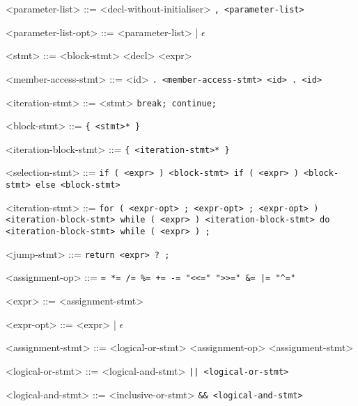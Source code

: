 \documentclass[a4paper, 12pt]{extarticle}
\begin{document}
\begin{grammar}
            <parameter-list> ::= <decl-without-initialiser> \tt{,} <parameter-list>

            <parameter-list-opt> ::= <parameter-list> | $\epsilon$

            <stmt> ::= <block-stmt>
            \alt <decl>
            \alt <expr>
            
            <member-access-stmt> ::= <id> \tt{.} <member-access-stmt>
            \alt <id> \tt{.} <id>

            <iteration-stmt> ::= <stmt>
            \alt \tt{break};
            \alt \tt{continue};
            
            <block-stmt> ::= \tt{\{} <stmt>* \tt{\}}
            
            <iteration-block-stmt> ::= \tt{\{} <iteration-stmt>* \tt{\}}

            <selection-stmt> ::= \tt{if} \tt{(} <expr> \tt{)} <block-stmt>
            \alt \tt{if} \tt{(} <expr> \tt{)} <block-stmt> \tt{else} <block-stmt>

            <iteration-stmt> ::= \tt{for} \tt{(} <expr-opt> \tt{;} <expr-opt> \tt{;} <expr-opt> \tt{)} <iteration-block-stmt>
            \alt \tt{while} \tt{(} <expr> \tt{)} <iteration-block-stmt>
            \alt \tt{do} <iteration-block-stmt> \tt{while} \tt{(} <expr> \tt{)} \tt{;}

            <jump-stmt> ::= \tt{return} <expr> ? \tt{;}

            <assignment-op> ::= \tt{=}
            \alt \tt{*=}
            \alt \tt{/=}
            \alt \tt{\%=}
            \alt \tt{+=}
            \alt \tt{-=}
            \alt \tt{"<<="}
            \alt \tt{">>="}
            \alt \tt{\&=}
            \alt \tt{|=}
            \alt \tt{"^="}

            <expr> ::= <assignment-stmt>

            <expr-opt> ::= <expr> | $\epsilon$

            <assignment-stmt> ::= <logical-or-stmt>
             <assignment-op> <assignment-stmt>

            <logical-or-stmt> ::= <logical-and-stmt>
             \tt{||} <logical-or-stmt>

            <logical-and-stmt> ::= <inclusive-or-stmt>
             \tt{\&\&} <logical-and-stmt>


\end{grammar}
\end{document}
